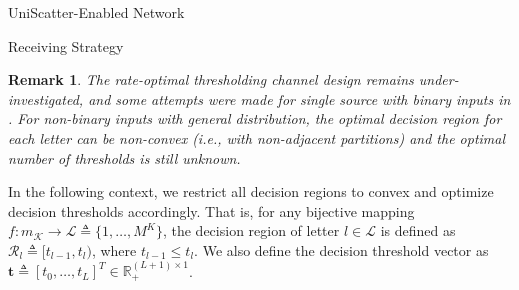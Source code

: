 \documentclass[journal]{IEEEtran}
\newtheorem{remark}{Remark}
\begin{document}
\begin{section}{UniScatter-Enabled Network}
\begin{subsection}{Receiving Strategy}
		\begin{remark}
			The rate-optimal thresholding channel design remains under-investigated, and some attempts were made for single source with binary inputs in \cite{Qian2019b,Nguyen2021b}.
			For non-binary inputs with general distribution, the optimal decision region for each letter can be non-convex (i.e., with non-adjacent partitions) and the optimal number of thresholds is still unknown.
		\end{remark}
		In the following context, we restrict all decision regions to convex and optimize decision thresholds accordingly. That is, for any bijective mapping $f : m_{\mathcal{K}} \to \mathcal{L} \triangleq \{1,\ldots,M^K\}$, the decision region of letter $l \in \mathcal{L}$ is defined as $\mathcal{R}_l \triangleq [t_{l-1},t_l)$, where $t_{l-1} \le t_l$. We also define the decision threshold vector as $\boldsymbol{t} \triangleq [t_0,\ldots,t_L]^T \in \mathbb{R}_+^{(L+1) \times 1}$.
	\end{subsection}


\end{section}
\end{document}
